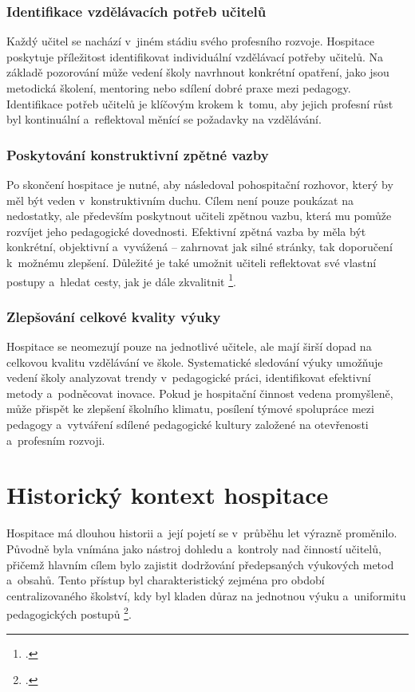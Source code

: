 \subsubsection{Identifikace vzdělávacích potřeb učitelů}

Každý učitel se nachází v~jiném stádiu svého profesního rozvoje. Hospitace poskytuje příležitost identifikovat individuální vzdělávací potřeby učitelů. Na základě pozorování může vedení školy navrhnout konkrétní opatření, jako jsou metodická školení, mentoring nebo sdílení dobré praxe mezi pedagogy. Identifikace potřeb učitelů je klíčovým krokem k~tomu, aby jejich profesní růst byl kontinuální a~reflektoval měnící se požadavky na vzdělávání.

\subsubsection{Poskytování konstruktivní zpětné vazby}

Po skončení hospitace je nutné, aby následoval pohospitační rozhovor, který by měl být veden v~konstruktivním duchu. Cílem není pouze poukázat na nedostatky, ale především poskytnout učiteli zpětnou vazbu, která mu pomůže rozvíjet jeho pedagogické dovednosti. Efektivní zpětná vazba by měla být konkrétní, objektivní a~vyvážená – zahrnovat jak silné stránky, tak doporučení k~možnému zlepšení. Důležité je také umožnit učiteli reflektovat své vlastní postupy a~hledat cesty, jak je dále zkvalitnit \footcite{rozvijejici-hospotace}. 

\subsubsection{Zlepšování celkové kvality výuky}

Hospitace se neomezují pouze na jednotlivé učitele, ale mají širší dopad na celkovou kvalitu vzdělávání ve škole. Systematické sledování výuky umožňuje vedení školy analyzovat trendy v~pedagogické práci, identifikovat efektivní metody a~podněcovat inovace. Pokud je hospitační činnost vedena promyšleně, může přispět ke zlepšení školního klimatu, posílení týmové spolupráce mezi pedagogy a~vytváření sdílené pedagogické kultury založené na otevřenosti a~profesním rozvoji.


\section{Historický kontext hospitace}

Hospitace má dlouhou historii a~její pojetí se v~průběhu let výrazně proměnilo. Původně byla vnímána jako nástroj dohledu a~kontroly nad činností učitelů, přičemž hlavním cílem bylo zajistit dodržování předepsaných výukových metod a~obsahů. Tento přístup byl charakteristický zejména pro období centralizovaného školství, kdy byl kladen důraz na jednotnou výuku a~uniformitu pedagogických postupů \footcite{ped-proces-rizeni}.

